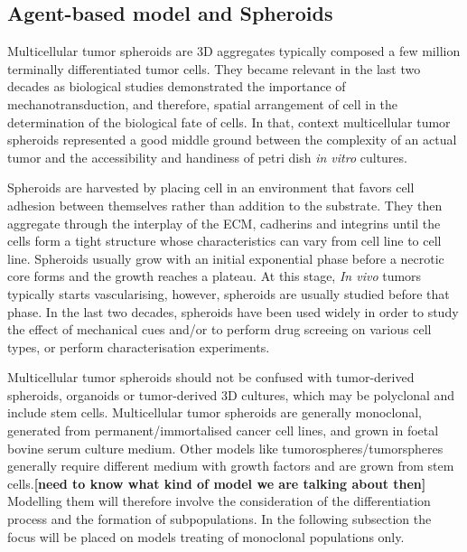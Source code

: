 \documentclass[11pt,a4paper]{article}
\begin{document}
\subsection{Agent-based model and Spheroids}
Multicellular tumor spheroids are 3D aggregates typically composed a few million terminally differentiated tumor cells. They became relevant in the last two decades as biological studies demonstrated the importance of mechanotransduction, and therefore, spatial arrangement of cell in the determination of the biological fate of cells. In that, context multicellular tumor spheroids represented a good middle ground between the complexity of an actual tumor and the accessibility and handiness of petri dish \textit{in vitro} cultures.\cite{Cui2017} 

Spheroids are harvested by placing cell in an environment that favors cell adhesion between themselves rather than addition to the substrate. They then aggregate through the interplay of the ECM, cadherins and integrins until the cells form  a tight structure whose characteristics can vary from cell line to cell line. Spheroids usually grow with an initial exponential phase before a necrotic core forms and the growth reaches a plateau. At this stage, \textit{In vivo} tumors typically starts vascularising, however, spheroids are usually studied before that phase. In the last two decades, spheroids have been used widely in order to study the effect of mechanical cues and/or to perform drug screeing on various cell types,\cite{Costa2016} or perform characterisation experiments.\cite{Margueritat2019}\cite{Leroux2015}  

Multicellular tumor spheroids should not be confused with tumor-derived spheroids, organoids or tumor-derived 3D cultures, which may be polyclonal and include stem cells. Multicellular tumor spheroids are generally monoclonal, generated from permanent/immortalised cancer cell lines, and grown in foetal bovine serum culture medium.\cite{Ishiguro2017} Other models like tumorospheres/tumorspheres generally require different medium with growth factors and are grown from stem cells.\textbf{[need to know what kind of model we are talking about then]} Modelling them will therefore involve the consideration of the differentiation process and the formation of subpopulations. In the following subsection the focus will be placed on models treating of monoclonal populations only. 
\end{document}

